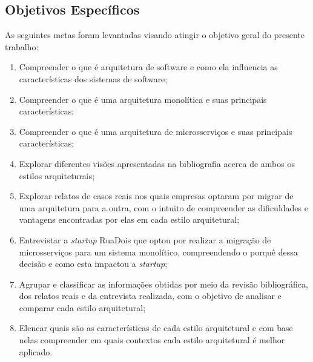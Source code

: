 \subsection{Objetivos Específicos}

As seguintes metas foram levantadas visando atingir o objetivo geral do presente
trabalho:

  \begin{enumerate}
      \item Compreender o que é arquitetura de software e como ela influencia as características dos
          sistemas de software;
      \item Compreender o que é uma arquitetura monolítica e suas principais características;
      \item Compreender o que é uma arquitetura de microsserviços e suas principais características;
      \item Explorar diferentes visões apresentadas na bibliografia acerca de ambos os estilos
          arquiteturais;
      \item Explorar relatos de casos reais nos quais empresas optaram por migrar de uma arquitetura
          para a outra, com o intuito de compreender as dificuldades e vantagens encontradas por
          elas em cada estilo arquitetural;
      \item Entrevistar a \textit{startup} RuaDois que optou por realizar a migração de
          microsserviços para um sistema monolítico, compreendendo o porquê dessa decisão e como
          esta impactou a \textit{startup};
      \item Agrupar e classificar as informações obtidas por meio da revisão bibliográfica, dos
          relatos reais e da entrevista realizada, com o objetivo de analisar e comparar cada estilo
          arquitetural;
      \item Elencar quais são as características de cada estilo arquitetural e com base nelas
          compreender em quais contextos cada estilo arquitetural é melhor aplicado.
  \end{enumerate}
